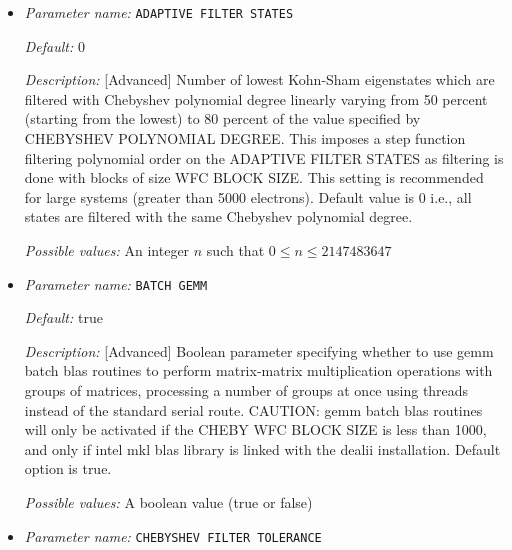 \begin{itemize}
\item {\it Parameter name:} {\tt ADAPTIVE FILTER STATES}
\label{parameters:SCF parameters/Eigen_2dsolver parameters/ADAPTIVE FILTER STATES}
\label{parameters:SCF_20parameters/Eigen_2dsolver_20parameters/ADAPTIVE_20FILTER_20STATES}




{\it Default:} 0


{\it Description:} [Advanced] Number of lowest Kohn-Sham eigenstates which are filtered with Chebyshev polynomial degree linearly varying from 50 percent (starting from the lowest) to 80 percent of the value specified by CHEBYSHEV POLYNOMIAL DEGREE. This imposes a step function filtering polynomial order on the ADAPTIVE FILTER STATES as filtering is done with blocks of size WFC BLOCK SIZE. This setting is recommended for large systems (greater than 5000 electrons). Default value is 0 i.e., all states are filtered with the same Chebyshev polynomial degree.


{\it Possible values:} An integer $n$ such that $0\leq n \leq 2147483647$
\item {\it Parameter name:} {\tt BATCH GEMM}
\label{parameters:SCF parameters/Eigen_2dsolver parameters/BATCH GEMM}
\label{parameters:SCF_20parameters/Eigen_2dsolver_20parameters/BATCH_20GEMM}




{\it Default:} true


{\it Description:} [Advanced] Boolean parameter specifying whether to use gemm batch blas routines to perform matrix-matrix multiplication operations with groups of matrices, processing a number of groups at once using threads instead of the standard serial route. CAUTION: gemm batch blas routines will only be activated if the CHEBY WFC BLOCK SIZE is less than 1000, and only if intel mkl blas library is linked with the dealii installation. Default option is true.


{\it Possible values:} A boolean value (true or false)
\item {\it Parameter name:} {\tt CHEBYSHEV FILTER TOLERANCE}
\label{parameters:SCF parameters/Eigen_2dsolver parameters/CHEBYSHEV FILTER TOLERANCE}
\label{parameters:SCF_20parameters/Eigen_2dsolver_20parameters/CHEBYSHEV_20FILTER_20TOLERANCE}



\end{itemize}
